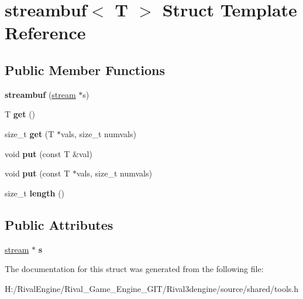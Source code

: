 \hypertarget{structstreambuf}{}\section{streambuf$<$ T $>$ Struct Template Reference}
\label{structstreambuf}
\subsection*{Public Member Functions}
\begin{DoxyCompactItemize}
\item 
\mbox{\label{structstreambuf_a7b09939aedbfdd57320f6db6d1e8c955}} 
{\bfseries streambuf} (\hyperlink{structstream}{stream} $\ast$s)
\item 
\mbox{\label{structstreambuf_a9f48098bea2b265e664b1a201e89908e}} 
T {\bfseries get} ()
\item 
\mbox{\label{structstreambuf_a09edc98142dd6b18fc3a93bf3f02d9f9}} 
size\+\_\+t {\bfseries get} (T $\ast$vals, size\+\_\+t numvals)
\item 
\mbox{\label{structstreambuf_a42977269697981d90f539f393eef0695}} 
void {\bfseries put} (const T \&val)
\item 
\mbox{\label{structstreambuf_ad471c9074dd6aea2828a040e0e1f923f}} 
void {\bfseries put} (const T $\ast$vals, size\+\_\+t numvals)
\item 
\mbox{\label{structstreambuf_a05789dbc88f7782ea0e473df9b75ae28}} 
size\+\_\+t {\bfseries length} ()
\end{DoxyCompactItemize}
\subsection*{Public Attributes}
\begin{DoxyCompactItemize}
\item 
\mbox{\label{structstreambuf_a13684e200a53c6724c752f6d5af6abec}} 
\hyperlink{structstream}{stream} $\ast$ {\bfseries s}
\end{DoxyCompactItemize}


The documentation for this struct was generated from the following file\+:\begin{DoxyCompactItemize}
\item 
H\+:/\+Rival\+Engine/\+Rival\+\_\+\+Game\+\_\+\+Engine\+\_\+\+G\+I\+T/\+Rival3dengine/source/shared/tools.\+h\end{DoxyCompactItemize}
